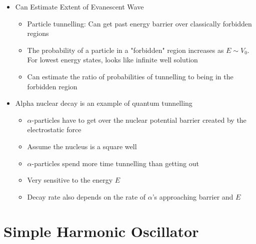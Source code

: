 \documentclass[12pt]{article}
\begin{document}
\begin{itemize}
    \item Can Estimate Extent of Evanescent Wave \begin{itemize}
        \item Particle tunnelling: Can get past energy barrier over classically forbidden regions
        \item The probability of a particle in a "forbidden" region increases as $E \sim V_0$. For lowest energy states, looks like infinite well solution
        \item Can estimate the ratio of probabilities of tunnelling to being in the forbidden region
    \end{itemize}
    \item Alpha nuclear decay is an example of quantum tunnelling \begin{itemize}
        \item $\alpha$-particles have to get over the nuclear potential barrier created by the electrostatic force
        \item Assume the nucleus is a square well
        \item $\alpha$-particles spend more time tunnelling than getting out
        \item Very sensitive to the energy $E$
        \item Decay rate also depends on the rate of $\alpha$'s approaching barrier and $E$
    \end{itemize}
\end{itemize}

\section{Simple Harmonic Oscillator} 
\end{document}
